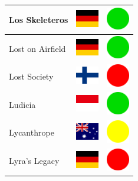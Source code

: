 \documentclass[12pt, a4paper, twoside]{report}
\begin{document}
\begin{center}
\begin{longtable}{|p{5cm}|p{2cm}|p{2cm}|}
 Los Skeleteros                                             & \includegraphics[width=1cm]{4x3/de} &   \includegraphics[width=1cm]{likes/y} \\ \hline
 Lost on Airfield                                           & \includegraphics[width=1cm]{4x3/de} &   \includegraphics[width=1cm]{likes/y} \\ \hline
 Lost Society                                               & \includegraphics[width=1cm]{4x3/fi} &   \includegraphics[width=1cm]{likes/n} \\ \hline
 Ludicia                                                    & \includegraphics[width=1cm]{4x3/id} &   \includegraphics[width=1cm]{likes/y} \\ \hline
 Lycanthrope                                                & \includegraphics[width=1cm]{4x3/au} &   \includegraphics[width=1cm]{likes/m} \\ \hline
 Lyra's Legacy                                              & \includegraphics[width=1cm]{4x3/de} &   \includegraphics[width=1cm]{likes/n} \\ \hline

\end{longtable}
\end{center}
\end{document}
